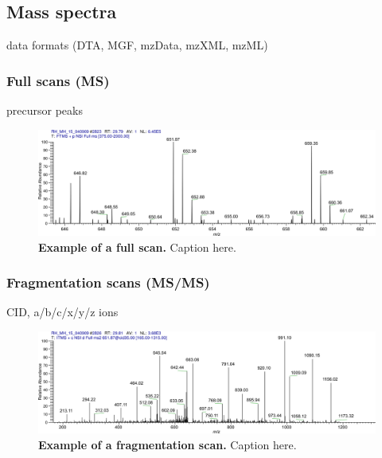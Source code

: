 \subsection{Mass spectra}

\begin{todo}
data formats (DTA, MGF, mzData, mzXML, mzML)
\end{todo}

\subsubsection{Full scans (MS)}

\begin{todo}
precursor peaks
\end{todo}

\begin{figure}[h]
\includegraphics[width=\textwidth]{figures/ms1-scan.jpg}
\caption{
{\bf Example of a full scan.} 
Caption here.
}
\label{fig:full-scan}
\end{figure}

\subsubsection{Fragmentation scans (MS/MS)}

\begin{todo}
CID, a/b/c/x/y/z ions
\end{todo}

\begin{figure}[h]
\includegraphics[width=\textwidth]{figures/ms2-scan.jpg}
\caption{
{\bf Example of a fragmentation scan.} 
Caption here.
}
\label{fig:fragmentation-scan}
\end{figure}

